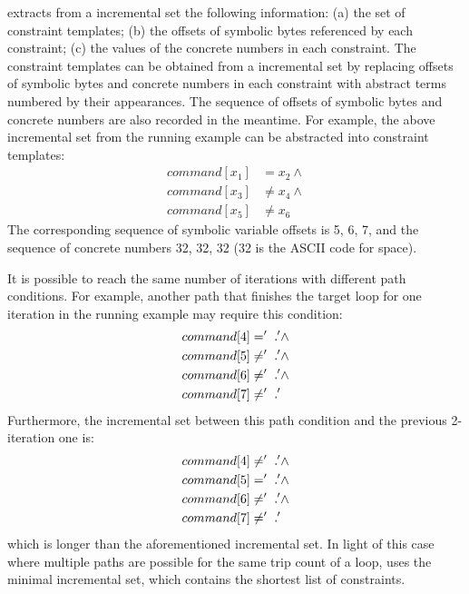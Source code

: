 \lancet extracts from a incremental set the following information: (a) the set of constraint templates; (b) the offsets of symbolic bytes referenced by each constraint; (c) the values of the concrete numbers in each constraint. 
The constraint templates can be obtained from a incremental set by replacing offsets of symbolic bytes and concrete numbers in each constraint with abstract terms numbered by their appearances.
The sequence of offsets of symbolic bytes and concrete numbers are also recorded in the meantime.
For example, the above incremental set from the running example can be abstracted into constraint templates:
\begin{align*}
   command[x_1] &= x_2 \land\\
   command[x_3] &\neq x_4 \land\\
   command[x_5] &\neq x_6
\end{align*}
The corresponding sequence of symbolic variable offsets is 5, 6, 7, and the sequence of concrete numbers 32, 32, 32 (32 is the ASCII code for space).

It is possible to reach the same number of iterations with different path conditions. For example, another path that finishes the target loop for one iteration in the running example may require this condition:
\begin{align*}
   command[4] &= '\vartextvisiblespace' \land\\
   command[5] &\neq '\vartextvisiblespace' \land\\
   command[6] &\neq '\vartextvisiblespace' \land\\
   command[7] &\neq '\vartextvisiblespace'
\end{align*}
Furthermore, the incremental set between this path condition and the previous 2-iteration one is:
\begin{align*}
   command[4] &\neq '\vartextvisiblespace' \land\\
   command[5] &= '\vartextvisiblespace' \land\\
   command[6] &\neq '\vartextvisiblespace' \land\\
   command[7] &\neq '\vartextvisiblespace'
\end{align*}
which is longer than the aforementioned incremental set.
In light of this case where multiple paths are possible for the same trip count of a loop, \lancet uses the minimal incremental set, which contains the shortest list of constraints.



